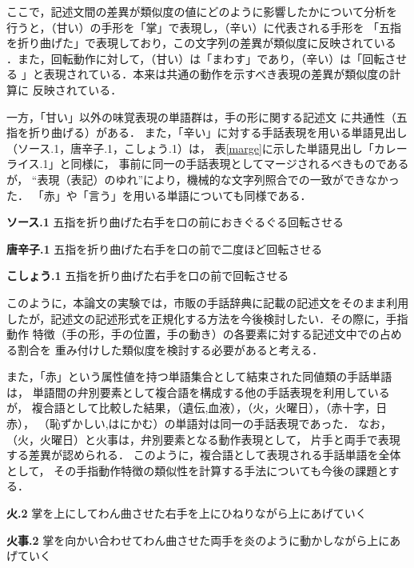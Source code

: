 \noindent
ここで，記述文間の差異が類似度の値にどのように影響したかについて分析を
行うと，（甘い）の手形を「掌」で表現し，（辛い）に代表される手形を
「五指を折り曲げた」で表現しており，この文字列の差異が類似度に反映されている
．また，回転動作に対して，（甘い）は「まわす」であり，（辛い）は「回転させる
」と表現されている．本来は共通の動作を示すべき表現の差異が類似度の計算に
反映されている．

一方，「甘い」以外の味覚表現の単語群は，手の形に関する記述文
に共通性（五指を折り曲げる）がある．
また，「辛い」に対する手話表現を用いる単語見出し
（ソース.1，唐辛子.1，こしょう.1）は，
表\ref{marge}に示した単語見出し「カレーライス.1」と同様に，
事前に同一の手話表現としてマージされるべきものであるが，
``表現（表記）のゆれ''により，機械的な文字列照合での一致ができなかった．
「赤」や「言う」を用いる単語についても同様である．

\begin{list}{}{\setlength{\topsep}{3pt}}
\item [{\bf ソース.1}]
五指を折り曲げた右手を口の前におきぐるぐる回転させる
\item [{\bf 唐辛子.1}]
五指を折り曲げた右手を口の前で二度ほど回転させる
\item [{\bf こしょう.1}]
五指を折り曲げた右手を口の前で回転させる
\end{list}

\noindent
このように，本論文の実験では，市販の手話辞典に記載の記述文をそのまま利用
したが，記述文の記述形式を正規化する方法を今後検討したい．その際に，手指動作
特徴（手の形，手の位置，手の動き）の各要素に対する記述文中での占める割合を
重み付けした類似度を検討する必要があると考える．

また，「赤」という属性値を持つ単語集合として結束された同値類の手話単語は，
単語間の弁別要素として複合語を構成する他の手話表現を利用しているが，
複合語として比較した結果，（遺伝,血液），（火，火曜日），（赤十字，日赤），
（恥ずかしい,はにかむ）の単語対は同一の手話表現であった．
なお，（火，火曜日）と火事は，弁別要素となる動作表現として，
片手と両手で表現する差異が認められる．
このように，複合語として表現される手話単語を全体として，
その手指動作特徴の類似性を計算する手法についても今後の課題とする．

\begin{list}{}{\setlength{\topsep}{3pt}}
\item [{\bf 火.2}] 
掌を上にしてわん曲させた右手を上にひねりながら上にあげていく
\item [{\bf 火事.2}]
掌を向かい合わせてわん曲させた両手を炎のように動かしながら上にあげていく
\end{list}

